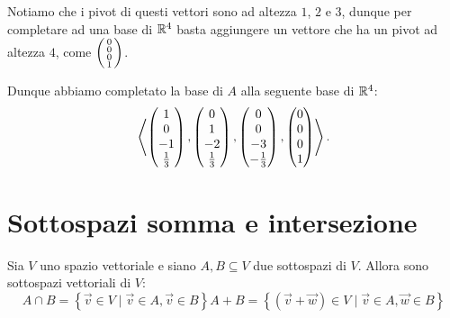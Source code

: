 \begin{solution}
    Notiamo che i pivot di questi vettori sono ad altezza $1$, $2$ e $3$, dunque per completare ad una base di $\mathbb{R}^4$ basta aggiungere un vettore che ha un pivot ad altezza $4$, come $\begin{psmallmatrix} 0\\0\\0\\1 \end{psmallmatrix}$.

    Dunque abbiamo completato la base di $A$ alla seguente base di $\mathbb{R}^4$: \[
        \left\langle 
            \begin{pmatrix}1\\0\\-1\\\frac13 \end{pmatrix}, 
            \begin{pmatrix}0\\1\\-2\\\frac13 \end{pmatrix}, 
            \begin{pmatrix}0\\0\\-3\\-\frac13 \end{pmatrix},
            \begin{pmatrix} 0\\0\\0\\1 \end{pmatrix}
         \right\rangle.      
    \]
\end{solution}

\section{Sottospazi somma e intersezione}

\begin{definition}
    Sia $V$ uno spazio vettoriale e siano $A, B \subseteq V$ due sottospazi di $V$. Allora sono sottospazi vettoriali di $V$:
    \begin{subequations}
        \begin{equation}
            A \cap B = \left\{ \vec{v} \in V \mid \vec v \in A, \vec v \in B\right\}
        \end{equation}
        \begin{equation}
            A + B = \left\{ (\vec{v} + \vec{w}) \in V \mid \vec v \in A, \vec w \in B\right\}
        \end{equation}
    \end{subequations}
\end{definition}

